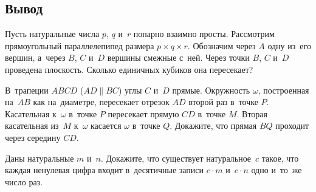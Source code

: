\ifupsurge
\subsection*{Вывод}

\begin{problems}

\item
Пусть натуральные числа $p$, $q$ и~$r$ попарно взаимно просты.
Рассмотрим прямоугольный параллелепипед размера $p \times q \times r$.
Обозначим через $A$ одну из~его вершин, а~через $B$, $C$ и~$D$ вершины смежные
с~ней.
Через точки $B$, $C$ и~$D$ проведена плоскость.
Сколько единичных кубиков она пересекает?


\item
В~трапеции $ABCD$ ($AD \parallel BC$) углы $C$ и~$D$ прямые.
Окружность $\omega$, построенная на~$AB$ как на~диаметре, пересекает отрезок
$AD$ второй раз в~точке $P$.
Касательная к~$\omega$ в~точке $P$ пересекает прямую $CD$ в~точке $M$.
Вторая касательная из~$M$ к~$\omega$ касается $\omega$ в~точке $Q$.
Докажите, что прямая $BQ$ проходит через середину $CD$.


\item
Даны натуральные $m$ и~$n$.
Докажите, что существует натуральное~$c$ такое, что каждая ненулевая цифра
входит в~десятичные записи $c \cdot m$ и~$c \cdot n$ одно и~то~же число раз.


\end{problems}
\fi %

\endgroup

